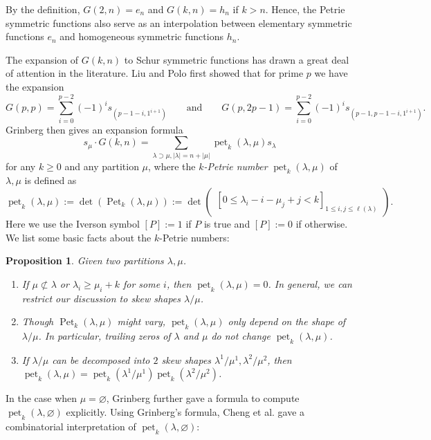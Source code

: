 \documentclass[pdflatex,sn-mathphys-num]{sn-jnl}%
\theoremstyle{thmstyleone}%
\newtheorem{proposition}[theorem]{Proposition}
\theoremstyle{thmstyletwo}%
\theoremstyle{thmstylethree}%
\numberwithin{equation}{section}
\DeclareMathOperator{\pet}{pet}
\DeclareMathOperator{\Pet}{Pet}
\begin{document}
	By the definition, $G(2,n)=e_n$ and $G(k,n)=h_n$ if $k>n$. Hence, the Petrie symmetric functions also serve as an interpolation between elementary symmetric functions $e_n$ and homogeneous symmetric functions $h_n$. 
	
	The expansion of $G(k,n)$ to Schur symmetric functions has drawn a great deal of attention in the literature. Liu and Polo \cite{LIU2021105352} first showed that for prime $p$ we have the expansion 
    \[G(p,p)=\sum_{i=0}^{p-2} (-1)^is_{(p-1-i,1^{i+1})} \qquad \text{and} \qquad G(p,2p-1)=\sum_{i=0}^{p-2} (-1)^is_{(p-1,p-1-i,1^{i+1})}.\]
    Grinberg \cite{Grinberg_2022} then gives an expansion formula
		\[ s_\mu\cdot G(k,n) = \sum_{\lambda \supset \mu, |\lambda|=n+|\mu|} \pet_k(\lambda,\mu) s_\lambda\]
	for any $k\geq 0$ and any partition $\mu$, where the \emph{$k$-Petrie number} $\pet_k(\lambda,\mu)$ of $\lambda,\mu$ is defined as
	\[\pet_k(\lambda,\mu):=\det(\Pet_k(\lambda,\mu)):=\det\begin{pmatrix}
		[0\leq \lambda_i-i-\mu_j+j<k]_{1\leq i,j\leq \ell(\lambda)}
	\end{pmatrix}.\]
	Here we use the Iverson symbol $[P]:= 1$ if $P$ is true and $[P]:=0$ if otherwise. We list some basic facts about the $k$-Petrie numbers:
	\begin{proposition}\label{prop:petk}
		Given two partitions $\lambda,\mu$. 
		\begin{enumerate}
			\item If $\mu\not\subset \lambda$ or $\lambda_i \geq \mu_i+k$ for some $i$, then $\pet_k(\lambda,\mu)=0$. In general, we can restrict our discussion to skew shapes $\lambda/\mu$.
			\item Though $\Pet_k(\lambda,\mu)$ might vary, $\pet_k(\lambda,\mu)$ only depend on the shape of $\lambda/\mu$. In particular, trailing zeros of $\lambda$ and $\mu$ do not change $\pet_k(\lambda,\mu)$.
			\item If $\lambda/\mu$ can be decomposed into $2$ skew shapes $\lambda^1/\mu^1,\lambda^2/\mu^2$, then $\pet_k(\lambda,\mu)=\pet_k(\lambda^1/\mu^1)\pet_k(\lambda^2/\mu^2)$.
		\end{enumerate}
	\end{proposition}

	In the case when $\mu=\varnothing$, Grinberg further gave a formula to compute $\pet_k(\lambda,\varnothing)$ explicitly. Using Grinberg's formula, Cheng et al.  \cite{cheng2022signedmultiplicitiesschurexpansions} gave a combinatorial interpretation of $\pet_k(\lambda,\varnothing)$:
\end{document}
